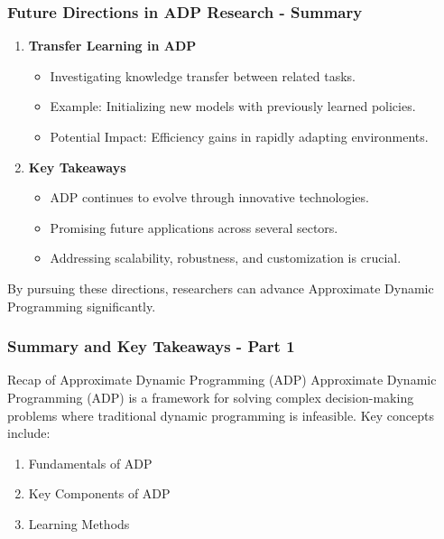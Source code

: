 \documentclass[aspectratio=169]{beamer}
\begin{document}
\begin{frame}[fragile]
    \frametitle{Future Directions in ADP Research - Summary}
    \begin{enumerate}
        \item \textbf{Transfer Learning in ADP}
            \begin{itemize}
                \item Investigating knowledge transfer between related tasks.
                \item Example: Initializing new models with previously learned policies.
                \item Potential Impact: Efficiency gains in rapidly adapting environments.
            \end{itemize}
            
        \item \textbf{Key Takeaways}
            \begin{itemize}
                \item ADP continues to evolve through innovative technologies.
                \item Promising future applications across several sectors.
                \item Addressing scalability, robustness, and customization is crucial.
            \end{itemize}
    \end{enumerate}
    By pursuing these directions, researchers can advance Approximate Dynamic Programming significantly.
\end{frame}

\begin{frame}[fragile]
    \frametitle{Summary and Key Takeaways - Part 1}
    \begin{block}{Recap of Approximate Dynamic Programming (ADP)}
        Approximate Dynamic Programming (ADP) is a framework for solving complex decision-making problems where traditional dynamic programming is infeasible. Key concepts include:
    \end{block}
    
    \begin{enumerate}
        \item Fundamentals of ADP
        \item Key Components of ADP
        \item Learning Methods
    \end{enumerate}
\end{frame}
\end{document}
